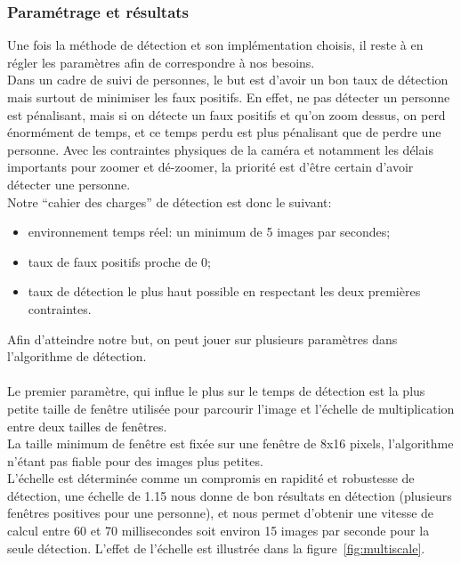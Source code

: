 \documentclass[12pt]{article}
\begin{document}
\subsubsection{Paramétrage et résultats}
Une fois la méthode de détection et son implémentation choisis, il reste à en régler les paramètres afin de correspondre à nos besoins.\\
Dans un cadre de suivi de personnes, le but est d'avoir un bon taux de détection mais surtout de minimiser les faux positifs. En effet, ne pas détecter un personne est pénalisant, mais si on détecte un faux positifs et qu'on zoom dessus, on perd énormément de temps, et ce temps perdu est plus pénalisant que de perdre une personne. Avec les contraintes physiques de la caméra et notamment les délais importants pour zoomer et dé-zoomer, la priorité est d'être certain d'avoir détecter une personne.\\
Notre ``cahier des charges'' de détection est donc le suivant:
\begin{itemize}  
	\item environnement temps réel: un minimum de 5 images par secondes; 
	\item taux de faux positifs proche de 0;
	\item taux de détection le plus haut possible en respectant les deux premières contraintes.
\end{itemize}
Afin d'atteindre notre but, on peut jouer sur plusieurs paramètres dans l'algorithme de détection.\\
\\
Le premier paramètre, qui influe le plus sur le temps de détection est la plus petite taille de fenêtre utilisée pour parcourir l'image et l'échelle de multiplication entre deux tailles de fenêtres.\\
La taille minimum de fenêtre est fixée sur une fenêtre de 8x16 pixels, l'algorithme n'étant pas fiable pour des images plus petites.\\
L'échelle est déterminée comme un compromis en rapidité et robustesse de détection, une échelle de 1.15 nous donne de bon résultats en détection (plusieurs fenêtres positives pour une personne), et nous permet d'obtenir une vitesse de calcul entre 60 et 70 millisecondes soit environ 15 images par seconde pour la seule détection. L'effet de l'échelle est illustrée dans la figure~\ref{fig:multiscale}.
\end{document}

